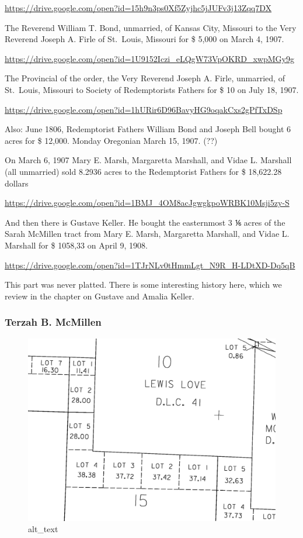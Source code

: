 \documentclass[
  12pt,
]{book}
\begin{document}
\url{https://drive.google.com/open?id=15h9n3ps0Xf5Zyjhc5jJUFv3j13Zqq7DX}

The Reverend William T. Bond, unmarried, of Kansas City, Missouri to the Very Reverend Joseph A. Firle of St.~Louis, Missouri for \$ 5,000 on March 4, 1907.

\url{https://drive.google.com/open?id=1U9152Iczi_eLQgW73VpOKRD_xwpMGy9g}

The Provincial of the order, the Very Reverend Joseph A. Firle, unmarried, of St.~Louis, Missouri to Society of Redemptorists Fathers for \$ 10 on July 18, 1907.

\url{https://drive.google.com/open?id=1hURir6D96BavyHG9oqakCxs2gPfTxDSp}

Also: June 1806, Redemptorist Fathers William Bond and Joseph Bell bought 6 acres for \$ 12,000. Monday Oregonian March 15, 1907. (??)

On March 6, 1907 Mary E. Marsh, Margaretta Marshall, and Vidae L. Marshall (all unmarried) sold 8.2936 acres to the Redemptorist Fathers for \$ 18,622.28 dollars

\url{https://drive.google.com/open?id=1BMJ_4OM8acJgwgkpoWRBK10Msji5zy-S}

And then there is Gustave Keller. He bought the easternmost 3 ⅙ acres of the Sarah McMillen tract from Mary E. Marsh, Margaretta Marshall, and Vidae L. Marshall for \$ 1058,33 on April 9, 1908.

\url{https://drive.google.com/open?id=1TJrNLv0tHmmLgt_N9R_H-LDtXD-Dq5qB}

This part was never platted. There is some interesting history here, which we review in the chapter on Gustave and Amalia Keller.

\hypertarget{terzah-b.-mcmillen}{%
\subsubsection{Terzah B. McMillen}\label{terzah-b.-mcmillen}}

\begin{figure}
\centering
\includegraphics{images/0202a_images/image8.png}
\caption{alt\_text}
\end{figure}
\end{document}

